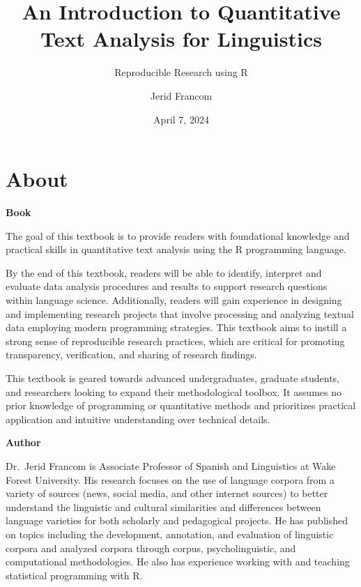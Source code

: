 \documentclass[
  letterpaper,
]{latex/krantz}
\title{An Introduction to Quantitative Text Analysis for Linguistics}
\subtitle{Reproducible Research using R}
\author{Jerid Francom}
\date{April 7, 2024}
\renewcommand*\contentsname{Table of contents}
\newcommand\contentsname{Table of contents}
\theoremstyle{definition}
\theoremstyle{remark}
\begin{document}
\maketitle



\renewcommand*\contentsname{Table of contents}
{
\setcounter{tocdepth}{2}
\tableofcontents
}

\chapter*{About}\label{about}


\textbf{Book}

The goal of this textbook is to provide readers with foundational
knowledge and practical skills in quantitative text analysis using the R
programming language.

By the end of this textbook, readers will be able to identify, interpret
and evaluate data analysis procedures and results to support research
questions within language science. Additionally, readers will gain
experience in designing and implementing research projects that involve
processing and analyzing textual data employing modern programming
strategies. This textbook aims to instill a strong sense of reproducible
research practices, which are critical for promoting transparency,
verification, and sharing of research findings.

This textbook is geared towards advanced undergraduates, graduate
students, and researchers looking to expand their methodological
toolbox. It assumes no prior knowledge of programming or quantitative
methods and prioritizes practical application and intuitive
understanding over technical details.

\textbf{Author}

Dr.~Jerid Francom is Associate Professor of Spanish and Linguistics at
Wake Forest University. His research focuses on the use of language
corpora from a variety of sources (news, social media, and other
internet sources) to better understand the linguistic and cultural
similarities and differences between language varieties for both
scholarly and pedagogical projects. He has published on topics including
the development, annotation, and evaluation of linguistic corpora and
analyzed corpora through corpus, psycholinguistic, and computational
methodologies. He also has experience working with and teaching
statistical programming with R.
\end{document}

